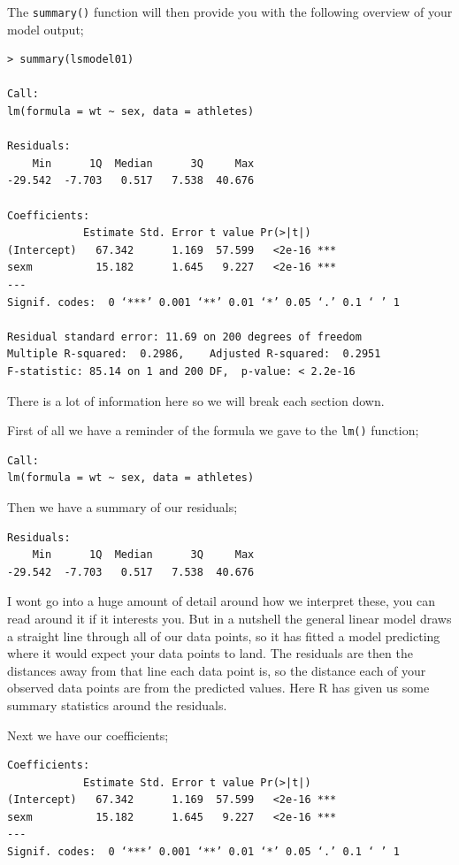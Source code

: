 \documentclass[
]{book}
\begin{document}
The \texttt{summary()} function will then provide you with the following overview of your model output;

\begin{verbatim}
> summary(lsmodel01)

Call:
lm(formula = wt ~ sex, data = athletes)

Residuals:
    Min      1Q  Median      3Q     Max 
-29.542  -7.703   0.517   7.538  40.676 

Coefficients:
            Estimate Std. Error t value Pr(>|t|)    
(Intercept)   67.342      1.169  57.599   <2e-16 ***
sexm          15.182      1.645   9.227   <2e-16 ***
---
Signif. codes:  0 ‘***’ 0.001 ‘**’ 0.01 ‘*’ 0.05 ‘.’ 0.1 ‘ ’ 1

Residual standard error: 11.69 on 200 degrees of freedom
Multiple R-squared:  0.2986,    Adjusted R-squared:  0.2951 
F-statistic: 85.14 on 1 and 200 DF,  p-value: < 2.2e-16
\end{verbatim}

There is a lot of information here so we will break each section down.

First of all we have a reminder of the formula we gave to the \texttt{lm()} function;

\begin{verbatim}
Call:
lm(formula = wt ~ sex, data = athletes)
\end{verbatim}

Then we have a summary of our residuals;

\begin{verbatim}
Residuals:
    Min      1Q  Median      3Q     Max 
-29.542  -7.703   0.517   7.538  40.676 
\end{verbatim}

I wont go into a huge amount of detail around how we interpret these, you can read around it if it interests you. But in a nutshell the general linear model draws a straight line through all of our data points, so it has fitted a model predicting where it would expect your data points to land. The residuals are then the distances away from that line each data point is, so the distance each of your observed data points are
from the predicted values. Here R has given us some summary statistics around the residuals.

Next we have our coefficients;

\begin{verbatim}
Coefficients:
            Estimate Std. Error t value Pr(>|t|)    
(Intercept)   67.342      1.169  57.599   <2e-16 ***
sexm          15.182      1.645   9.227   <2e-16 ***
---
Signif. codes:  0 ‘***’ 0.001 ‘**’ 0.01 ‘*’ 0.05 ‘.’ 0.1 ‘ ’ 1
\end{verbatim}
\end{document}
